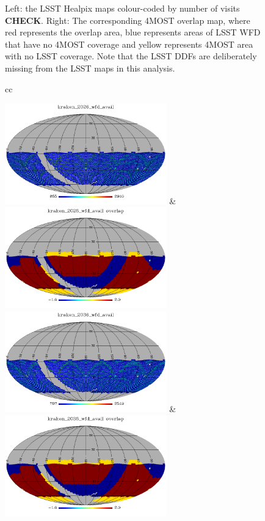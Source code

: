 \documentclass[a4paper,10pt]{article}
\begin{document}
\begin{figure}[htc]
\begin{tabular}{cc}
  \end{tabular}
  \caption{Left: the LSST Healpix maps colour-coded by number of
    visits {\bf CHECK}. Right: The corresponding 4MOST overlap map,
    where red represents the overlap area, blue represents areas of
    LSST WFD that have no 4MOST coverage and yellow represents 4MOST
    area with no LSST coverage. Note that the LSST DDFs are
    deliberately missing from the LSST maps in this analysis. }
  \label{overlap_maps}
\end{figure}

\begin{figure}[htc]
  \begin{tabular}{cc}

    \includegraphics[width=7.0cm]{kraken_2026_wfd_avail_ldep.png} & \includegraphics[width=7.0cm]{kraken_2026_wfd_avail_overlap.png} \cr
    \includegraphics[width=7.0cm]{kraken_2036_wfd_avail_ldep.png} & \includegraphics[width=7.0cm]{kraken_2036_wfd_avail_overlap.png} \cr

\end{tabular}
\end{figure}
\end{document}
